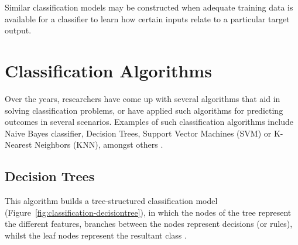 Similar classification models may be constructed when adequate training data is available for a classifier to learn how certain inputs relate to a particular target output.

\section{Classification Algorithms}
\label{sec:algorithms}

Over the years, researchers have come up with several algorithms that aid in solving classification problems, or have applied such algorithms for predicting outcomes in several scenarios. Examples of such classification algorithms include Naive Bayes classifier, Decision Trees, Support Vector Machines (SVM) or K-Nearest Neighbors (KNN), amongst others \citep{neelamegam2013}.

\subsection{Decision Trees} 

This algorithm builds a tree-structured classification model (Figure~\ref{fig:classification-decisiontree}), in which the nodes of the tree represent the different features, branches between the nodes represent decisions (or rules), whilst the leaf nodes represent the resultant class \citep{rokach2007}.

